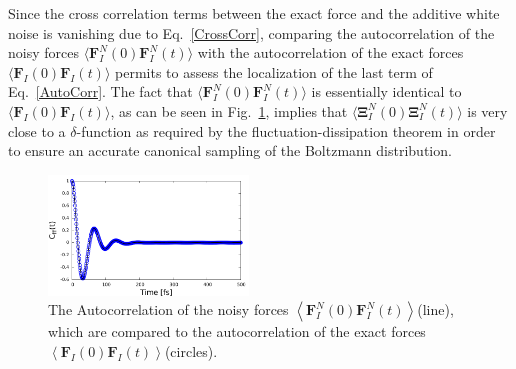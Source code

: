 Since the cross correlation terms between the exact force and the additive white noise is vanishing due to Eq.~\ref{CrossCorr}, comparing the autocorrelation of the noisy forces $\langle \textbf{F}_{I}^{N}(0)\textbf{F}_{I}^{N}(t)\rangle$ with the autocorrelation of the exact forces $\langle \textbf{F}_{I}(0) \textbf{F}_{I}(t)\rangle$ permits to assess the localization of the last term of Eq.~\ref{AutoCorr}.
The fact that $\langle \textbf{F}_{I}^{N}(0)\textbf{F}_{I}^{N}(t)\rangle$ is essentially identical to $\langle \textbf{F}_{I}(0) \textbf{F}_{I}(t)\rangle$, as can be seen in Fig.~\ref{Fig4}, implies that $\langle \mathbf{\Xi } _{I}^{N}(0) \mathbf{\Xi } _{I}^{N}(t)\rangle$ is very close to a $\delta$-function as required by the fluctuation-dissipation theorem in order to ensure an accurate canonical sampling of the Boltzmann distribution. 
\begin{figure}%
\begin{center}
\includegraphics[width=0.475\textwidth]
{figures/force_autocorrelation.pdf}
\end{center}
\caption{\label{Fig4}
The Autocorrelation of the noisy forces \(
\left \langle \textbf{F}_{I}^{N}\left ( 0 \right ) \textbf{F}_{I}^{N}\left ( t \right )\right \rangle \)(line), which are compared to the autocorrelation of the exact forces \( \left \langle \textbf{F}_{I}\left ( 0 \right ) \textbf{F}_{I}\left ( t \right )\right \rangle \)(circles). 
} \end{figure}

